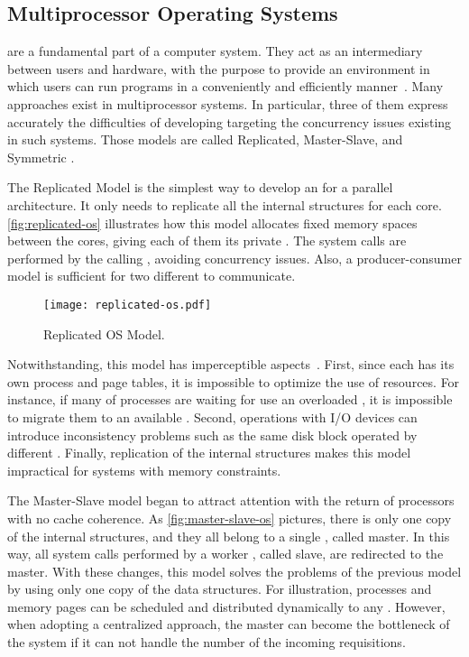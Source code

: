 		\subsection{Multiprocessor Operating Systems}
		\label{sec.multiprocessor-os}

			\oss are a fundamental part of a computer system.
			They act as an intermediary between users and hardware, with the
			purpose to provide an environment in which users can run programs
			in a conveniently and efficiently manner~\cite{Silberschatz:9ed}.
			Many \os approaches exist in multiprocessor systems.
			In particular, three of them express accurately the difficulties
			of developing \oss targeting the concurrency issues existing in
			such systems.
			Those models are called Replicated, Master-Slave, and Symmetric \os.

			The Replicated Model is the simplest way to develop an \os for a
			parallel architecture.
			It only needs to replicate all the internal \os structures for each core.
			\autoref{fig:replicated-os} illustrates how this model allocates fixed memory spaces
			between the cores, giving each of them its private \os.
			The system calls are performed by the calling \cpu, avoiding concurrency issues.
			Also, a producer-consumer model is sufficient for two different \cpus to communicate.

			\begin{figure}[!tb]
				\centering%
				\caption{Replicated OS Model.}%
				\label{fig:replicated-os}%
				\texttt{[image: replicated-os.pdf]}%
			\end{figure}

			Notwithstanding, this model has imperceptible aspects~\cite{tanenbaum:4ed}.
			First, since each \cpu has its own process and page tables, it is impossible
			to optimize the use of resources.
			For instance, if many of processes are waiting for use an overloaded \cpu,
			it is impossible to migrate them to an available \cpu.
			Second, operations with I/O devices can introduce inconsistency problems
			such as the same disk block operated by different \cpus.
			Finally, replication of the internal \os structures makes this model
			impractical for systems with memory constraints.

			The Master-Slave model began to attract attention with the return of
			processors with no cache coherence.
			As \autoref{fig:master-slave-os} pictures, there is only one copy of
			the internal \os structures, and they all belong to a single \cpu, called master.
			In this way, all system calls performed by a worker \cpu, called slave,
			are redirected to the master.
			With these changes, this model solves the problems of the previous model
			by using only one copy of the data structures.
			For illustration, processes and memory pages can be scheduled and
			distributed dynamically to any \cpus.
			However, when adopting a centralized approach, the master can become
			the bottleneck of the system if it can not handle the number of the
			incoming requisitions.

